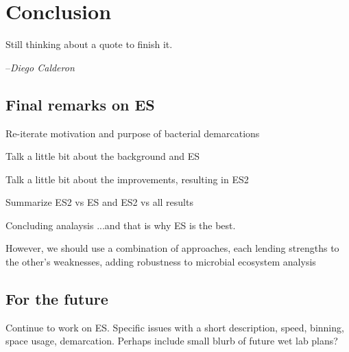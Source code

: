 \gobbletocpage
\chapter{Conclusion}
\restoretocpage

\begin{shadequote}
Still thinking about a quote to finish it. \par--\emph{Diego Calderon}
\end{shadequote}


\section{Final remarks on ES}

Re-iterate motivation and purpose of bacterial demarcations


Talk a little bit about the background and ES

Talk a little bit about the improvements, resulting in ES2

Summarize ES2 vs ES and ES2 vs all results

Concluding analaysis
...and that is why ES is the best.

However, we should use a combination of approaches, each lending strengths to the other's weaknesses, adding robustness to microbial ecosystem analysis~\cite{bohannan2003new}

\section{For the future}
Continue to work on ES.
Specific issues with a short description, speed, binning, space usage, demarcation.
Perhaps include small blurb of future wet lab plans?
